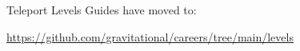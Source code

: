 \documentclass{article}
\begin{document}
Teleport Levels Guides have moved to:

\bigbreak

\url{https://github.com/gravitational/careers/tree/main/levels}
\end{document}
